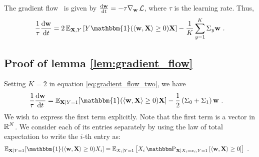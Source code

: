 The gradient flow~\cite{elkabetz2024continuous} is given by $\frac{\mathrm{d}\mathbf{w}}{\mathrm{d}t} = -\tau \nabla_\mathbf{w} \operatorname{\mathcal{L}}$, where $\tau$ is the learning rate.
Thus,
\begin{equation}
  \frac{1}{\tau} \frac{\mathrm{d}\mathbf{w}}{\mathrm{d}t}
    = 2 \E_{\mathbf{X},Y}\left[ Y \mathbbm{1}( \langle \mathbf{w}, \mathbf{X} \rangle \geq 0) \mathbf{X} \right] - \frac{1}{K} \sum_{y=1}^{K} \Sigma_y \mathbf{w}~. \label{eq:gradient_flow_two}
\end{equation}


\subsection{Proof of lemma \ref{lem:gradient_flow}} \label{subsec:pf_of_gradient_flow}
Setting $K = 2$ in equation \eqref{eq:gradient_flow_two}, we have
\begin{align*}
  \frac{1}{\tau} \frac{\mathrm{d}\mathbf{w}}{\mathrm{d}t} 
  &= \E_{\mathbf{X} \mid Y=1}[ \mathbbm{1}( \langle \mathbf{w}, \mathbf{X} \rangle \geq 0 ) \mathbf{X} ] - \frac{1}{2} \left( \Sigma_0 + \Sigma_1 \right) \mathbf{w}~.
\end{align*}
We wish to express the first term explicitly.
Note that the first term is a vector in $\operatorname{\mathbb{R}}^N$.
We consider each of its entries separately by
using the law of total expectation to write the $i$-th entry as:
\begin{align*}
    \E_{\mathbf{X} \mid Y=1}[ \mathbbm{1}( \langle \mathbf{w}, \mathbf{X} \rangle \geq 0 ) X_i ] 
    &= \E_{ X_i \mid Y=1 } \left[ X_i \PR_{\mathbf{X} \mid X_i=x_i, Y = 1} \left[  \langle \mathbf{w}, \mathbf{X} \rangle \geq 0 \right] \right]~.
\end{align*}

